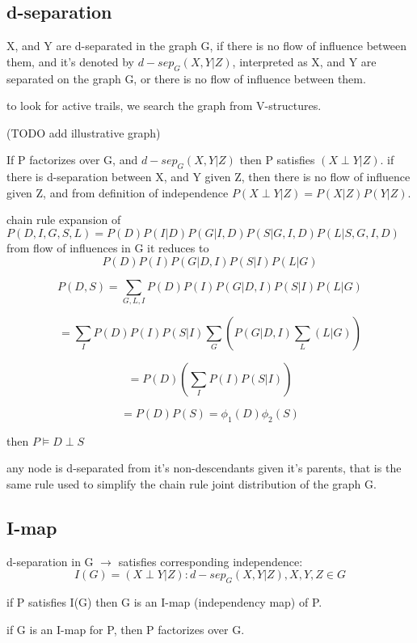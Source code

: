 \documentclass[4apaper,12pt]{book}
\begin{document}
\begin{description}
\begin{description}
\begin{description}
        \section{d-separation}
        \begin{description}
        \item X, and Y are d-separated in the graph G, if there is no flow of influence between them, and it's denoted by $d-sep_G(X,Y|Z)$, interpreted as X, and Y are separated on the graph G, or there is no flow of influence between them.
        \item to look for active trails, we search the graph from V-structures.
        \item (TODO add illustrative graph)
        \item If P factorizes over G, and $d-sep_G(X,Y|Z)$ then P satisfies $(X \perp Y|Z)$. if there is d-separation between X, and Y given Z, then there is no flow of influence given Z, and from definition of independence $P(X \perp Y | Z) = P(X|Z)P(Y|Z)$.
        \item chain rule expansion of $P(D,I,G,S,L)=P(D)P(I|D)P(G|I,D)P(S|G,I,D)P(L|S,G,I,D)$ from flow of influences in G it reduces to $$P(D)P(I)P(G|D,I)P(S|I)P(L|G)$$
        \item $$P(D,S)=\sum_{G,L,I}P(D)P(I)P(G|D,I)P(S|I)P(L|G)$$
        \item $$=\sum_{I}P(D)P(I)P(S|I)\sum_{G}(P(G|D,I)\sum_{L}(L|G))$$
        \item $$=P(D)(\sum_IP(I)P(S|I))$$
        \item $$=P(D)P(S)=\phi_1(D)\phi_2(S)$$
        \item then $P \models D \perp S$
        \item any node is d-separated from it's non-descendants given it's parents, that is the same rule used to simplify the chain rule joint distribution of the graph G.
          \subsection{I-map}
          \begin{description}
          \item d-separation in G $\rightarrow$ satisfies corresponding independence: $$ I(G) = {(X \perp Y | Z) : d-sep_G(X,Y|Z), X,Y,Z \in G} $$
          \item if P satisfies I(G) then G is an I-map (independency map) of P.
          \item if G is an I-map for P, then P factorizes over G.


          \end{description}
        \end{description}
      \end{description}
    \end{description}
  \end{description}
\end{document}
